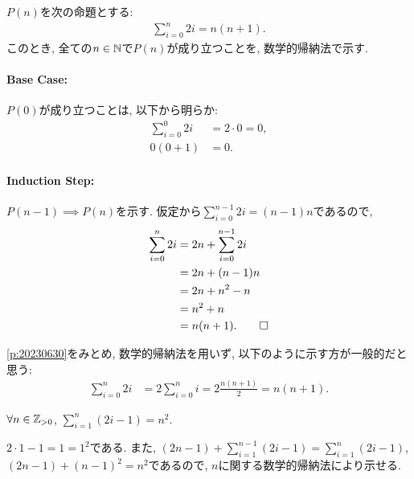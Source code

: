 \begin{proof*}
  $P(n)$を次の命題とする:
  \begin{align*}
    \sum_{i=0}^{n}2i=n(n+1).
  \end{align*}
  このとき, 全ての$n\in\mathbb{N}$で$P(n)$が成り立つことを,
  数学的帰納法で示す.

  \paragraph{Base Case:}
  $P(0)$が成り立つことは, 以下から明らか:
  \begin{align*}
    \sum_{i=0}^{0}2i&=2\cdot 0=0,\\
    0(0+1)&=0.
  \end{align*}

  \paragraph{Induction Step:}
  $P(n-1)\implies P(n)$を示す.
  仮定から$\sum_{i=0}^{n-1}2i=(n-1)n$であるので,
  \begin{align*}
    \sum_{i=0}^{n}2i&=2n+\sum_{i=0}^{n-1}2i\\
    &=2n+(n-1)n\\
    &=2n+n^2-n\\
    &=n^2+n\\
    &=n(n+1).
    \qedhere
  \end{align*}
\end{proof*}

\begin{rem}
  \cref{p:20230630}をみとめ,
  数学的帰納法を用いず, 以下のように示す方が一般的だと思う:
  \begin{align*}
    \sum_{i=0}^{n}2i&=
    2\sum_{i=0}^{n}i
    =2\frac{n(n+1)}{2}=n(n+1).
  \end{align*}
\end{rem}

\begin{prop}
  \label{p:20230704}
  $\forall n\in\mathbb{Z}_{>0}$, $\sum_{i=1}^{n}(2i-1)=n^2$.
\end{prop}

\begin{proof**}
  $2\cdot 1-1=1=1^2$である.
  また,
  $(2n-1)+\sum_{i=1}^{n-1}(2i-1)=\sum_{i=1}^{n}(2i-1)$,
  $(2n-1)+(n-1)^2=n^2$であるので,
  $n$に関する数学的帰納法により示せる.
\end{proof**}

